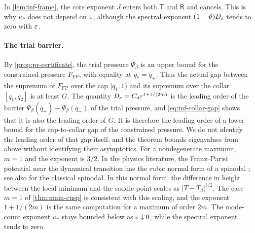In \cref{lem:inf-frame}, the core exponent $J$ enters both $\mathsf T$ and $\mathsf R$ and cancels. This is why $\kappa_*$ does not depend on $\varepsilon$, although the spectral exponent $(1-\vartheta)D_\varepsilon$ tends to zero with $\varepsilon$.

\paragraph{The trial barrier.} By \cref{prop:pr-certificate}, the trial pressure $\Psi_\beta$ is an upper bound for the constrained pressure $F_{\mathrm{FP}}$, with equality at $q_*=q_+$. Thus the actual gap between the supremum of $F_{\mathrm{FP}}$ over the cap $[q_1,1)$ and its supremum over the collar $[q_1,q_2]$ is at least $G$. The quantity $D_\varepsilon=C_d\varepsilon^{1+1/(2m)}$ is the leading order of the barrier $\Psi_\beta(q_+)-\Psi_\beta(q_-)$ of the trial pressure, and \eqref{eq:inf-collar-gap} shows that it is also the leading order of $G$. It is therefore the leading order of a lower bound for the cap-to-collar gap of the constrained pressure. We do not identify the leading order of that gap itself, and the theorem bounds eigenvalues from above without identifying their asymptotics. For a nondegenerate maximum, $m=1$ and the exponent is $3/2$. In the physics literature, the Franz--Parisi potential near the dynamical transition has the cubic normal form of a spinodal \cite[Section~5.2.1]{Franz2005}; see also \cite{UngerKlein1984} for the classical spinodal. In this normal form, the difference in height between the local minimum and the saddle point scales as $|T-T_d|^{3/2}$. The case $m=1$ of \cref{thm:main-cusp} is consistent with this scaling, and the exponent $1+1/(2m)$ is the same computation for a maximum of order $2m$. The mode-count exponent $\kappa_*$ stays bounded below as $\varepsilon\downarrow0$, while the spectral exponent tends to zero.

